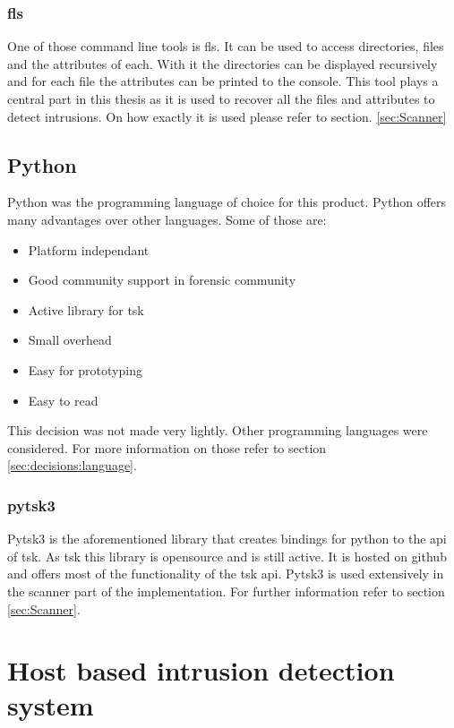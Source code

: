 \subsubsection{fls}
\label{sec:fls}

One of those command line tools is fls. It can be used to access directories, files and the attributes of each. With it the directories can be displayed recursively and for each file the attributes can be printed to the console. \cite{tsk:fls} This tool plays a central part in this thesis as it is used to recover all the files and attributes to detect intrusions. On how exactly it is used please refer to section. \ref{sec:Scanner}

\subsection{Python}
\label{sec:python}

Python was the programming language of choice for this product. Python offers many advantages over other languages. Some of those are:

\begin{itemize}
	\item Platform independant
	\item Good community support in forensic community
	\item Active library for \gls{tsk}
	\item Small overhead
	\item Easy for prototyping
	\item Easy to read
\end{itemize}

This decision was not made very lightly. Other programming languages were considered. For more information on those refer to section \ref{sec:decisions:language}.

\subsubsection{pytsk3}
\label{sec:pytsk3}

Pytsk3 is the aforementioned library that creates bindings for python to the \gls{api} of \gls{tsk}. As \gls{tsk} this library is \gls{opensource} and is still active. It is hosted on \gls{github} and offers most of the functionality of the \gls{tsk} \gls{api}. Pytsk3 is used extensively in the scanner part of the implementation. For further information refer to section \ref{sec:Scanner}.

\section{Host based intrusion detection system}
\label{sec:hids}

